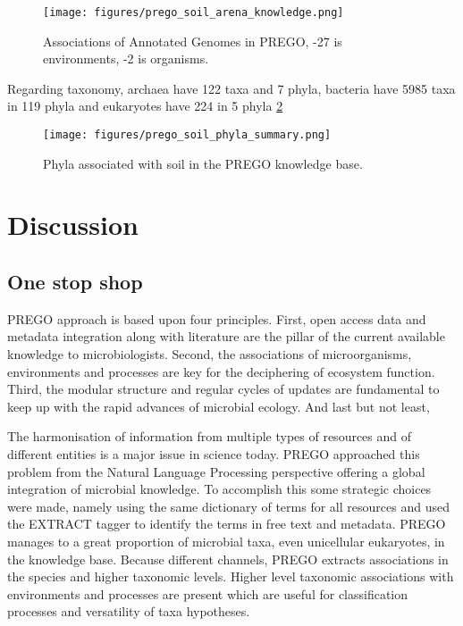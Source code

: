    \begin{figure}[hbt!]
      \centering
      \texttt{[image: figures/prego\_soil\_arena\_knowledge.png]}
      \caption[PREGO soil network of associations of annotated genomes]{
         Associations of Annotated Genomes in PREGO, -27 is environments, -2 is organisms.}
      \label{fig:prego-soil-network_k}
   \end{figure}

Regarding taxonomy, archaea have 122 taxa and 7 phyla, bacteria have 5985 taxa
in 119 phyla and eukaryotes have 224 in 5 phyla \ref{fig:prego-soil-phyla}

   \begin{figure}[hbt!]
      \centering
      \texttt{[image: figures/prego\_soil\_phyla\_summary.png]}
      \caption[PREGO soil taxonomy summary]{
         Phyla associated with soil in the PREGO knowledge base.}
      \label{fig:prego-soil-phyla}
   \end{figure}


\section{Discussion}
\label{sec:prego-discussion}

   \subsection{One stop shop}
   \label{subsec:prego-contents-disc}

PREGO approach is based upon four principles. First, open access data and
metadata integration along with literature are the pillar of the current
available knowledge to microbiologists. Second, the associations of microorganisms,
environments and processes are key for the deciphering of ecosystem function.
Third, the modular structure and regular cycles of updates are fundamental to
keep up with the rapid advances of microbial ecology. And last but not least,

The harmonisation of information from multiple types of resources and of different
entities is a major issue in science today. PREGO approached this problem from 
the Natural Language Processing perspective offering a global integration 
of microbial knowledge. To accomplish this some strategic choices were made, 
namely using the same dictionary of terms for all resources and used 
the EXTRACT tagger to identify the terms in free text and metadata.
PREGO manages to a great proportion of microbial taxa, even unicellular eukaryotes, in the knowledge base.
Because different channels, PREGO extracts associations in the species and higher taxonomic levels.
Higher level taxonomic associations with environments and processes are present
which are useful for classification processes and versatility of taxa hypotheses.

